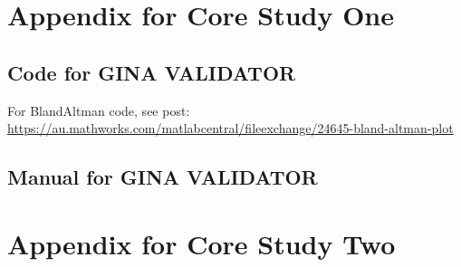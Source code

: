 \documentclass[12pt, openany, oneside]{book}
\begin{document}
\appendix



\chapter{Appendix for Core Study One}
\section{Code for GINA VALIDATOR}
\label{appendix:A}

%


%


%


For BlandAltman code, see post: \url{https://au.mathworks.com/matlabcentral/fileexchange/24645-bland-altman-plot}

\section{Manual for GINA VALIDATOR}
\label{appendix:GV}




\chapter{Appendix for Core Study Two}
\end{document}
